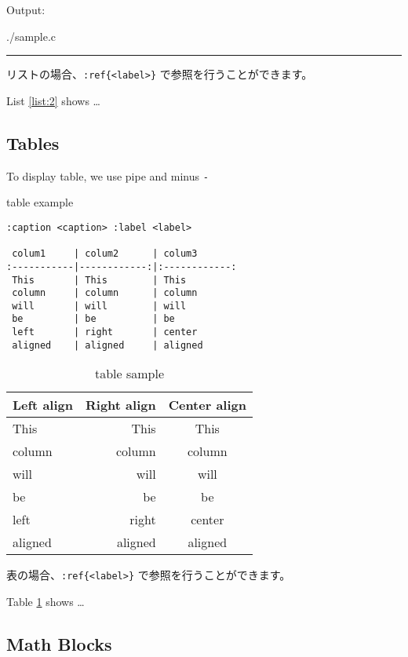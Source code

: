\documentclass[a4j, titlepage]{jarticle}
\begin{document}
Output:


{./sample.c}

\begin{center}
\rule{3in}{0.4pt}
\end{center}

リストの場合、{\tt :}{\tt ref\{\textless{}label\textgreater{}\}} で参照を行うことができます。

List \ref{list:2} shows \ldots{}

\subsection{Tables}

To display table, we use pipe {\tt \textbar{}} and minus {\tt -}

\begin{itembox}[c]{table example}
\begin{verbatim}
:caption <caption> :label <label>

 colum1     | colum2      | colum3
:-----------|------------:|:------------:
 This       | This        | This         
 column     | column      | column       
 will       | will        | will         
 be         | be          | be           
 left       | right       | center       
 aligned    | aligned     | aligned   
\end{verbatim}
\end{itembox}

\begin{table}[h]
\centering
\caption{table sample }
\label{table:1}
\begin{tabular}{|l|r|c|}
\hline
Left align & Right align & Center align\\
\hline
This & This & This\\
column & column & column\\
will & will & will\\
be & be & be\\
left & right & center\\
aligned & aligned & aligned\\
\hline
\end{tabular}
\end{table}

表の場合、{\tt :}{\tt ref\{\textless{}label\textgreater{}\}} で参照を行うことができます。

Table \ref{table:1} shows \ldots{}

\subsection{Math Blocks}
\end{document}
